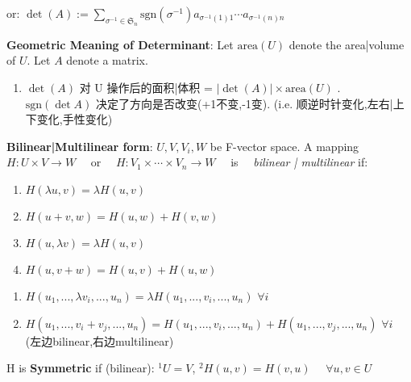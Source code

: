\documentclass[9pt]{article}
\begin{document}
\hspace{200pt} {\scriptsize or:} $\det(A):=\sum_{\sigma^{-1}\in\mathfrak{S}_n}\text{sgn}(\sigma^{-1})a_{\sigma^{-1}(1)1}\cdots a_{\sigma^{-1}(n)n}$

\textbf{Geometric Meaning of Determinant}: Let $\text{area}(U)$ denote the area|volume of $U$. \quad Let $A$ denote a matrix.
\begin{enumerate}[itemsep=-2pt, topsep=-2pt]
    \item {\footnotesize $\det(A)$ 对 U 操作后的面积|体积 = $|\det(A)|\times\text{area}(U)$} . \ {\footnotesize $\text{sgn}(\det A)$ 决定了方向是否改变(+1不变,-1变). {\scriptsize (i.e. 顺逆时针变化,左右|上下变化,手性变化)}}
\end{enumerate}

\vspace{3pt}
\textbf{Bilinear|Multilinear form}: {\small $U,V,V_i,W$ be F-vector space. \quad A mapping \ \ $H: U\times V\to W$ \ \ or \ \ $H:V_1\times \cdots\times V_n\to W$ \ \ is \ \ \textit{bilinear | multilinear} if:}

\vspace{2pt}
\noindent
\begin{minipage}{0.4\linewidth}
    \begin{enumerate}[itemsep=-2pt, topsep=-2pt]
        \item $H(\lambda u,v)=\lambda H(u,v)$
        \item $H(u+v,w)=H(u,w)+H(v,w)$
        \item $H(u,\lambda v)=\lambda H(u,v)$
        \item $H(u,v+w)=H(u,v)+H(u,w)$
    \end{enumerate}
\end{minipage}%
\hfill
\begin{minipage}{0.6\linewidth}
    \begin{enumerate}[itemsep=-2pt, topsep=-2pt]
        \item $H(u_1,...,\lambda v_i,...,u_n)=\lambda H(u_1,...,v_i,...,u_n)$ \quad $\forall i$
        \item $H(u_1,...,v_i+v_j,...,u_n)=H(u_1,...,v_i,...,u_n)+H(u_1,...,v_j,...,u_n)$ \quad $\forall i$ \\
        {\scriptsize (左边bilinear,右边multilinear)}
    \end{enumerate}
\end{minipage}

\vspace{3pt}
\quad H is \textbf{Symmetric} if (bilinear): $^1U=V$, \quad $^2H(u,v)=H(v,u)$ \ \ $\forall u,v\in U$
\end{document}
